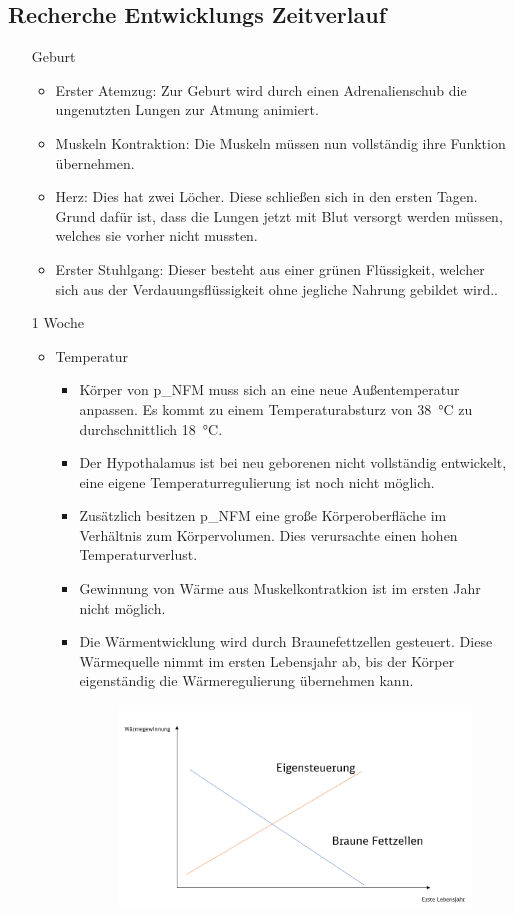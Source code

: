 \subsection{Recherche Entwicklungs Zeitverlauf}
\begin{enumerate}%
	\item[Geburt]
	\begin{itemize}
		\item Erster Atemzug: Zur Geburt wird durch einen Adrenalienschub die ungenutzten Lungen zur Atmung animiert.
		\item Muskeln Kontraktion: Die Muskeln müssen nun vollständig ihre Funktion übernehmen.
		\item Herz: Dies hat zwei Löcher. Diese schließen sich in den ersten Tagen. Grund dafür ist, dass die Lungen jetzt mit Blut versorgt werden müssen, welches sie vorher nicht mussten.
		\item Erster Stuhlgang: Dieser besteht aus einer grünen Flüssigkeit, welcher sich aus der Verdauungsflüssigkeit ohne jegliche Nahrung gebildet wird..
	\end{itemize}
	\item[1 Woche]
	\begin{itemize}
		\item Temperatur
		\begin{itemize}
			\item Körper von \gls{p_NFM} muss sich an eine neue Außentemperatur anpassen. Es kommt zu einem Temperaturabsturz von \SI{38}{\celsius} zu durchschnittlich \SI{18}{\celsius}.
			\item Der Hypothalamus ist bei neu geborenen nicht vollständig entwickelt, eine eigene Temperaturregulierung ist noch nicht möglich.
			\item Zusätzlich besitzen \gls{p_NFM} eine große Körperoberfläche im Verhältnis zum Körpervolumen. Dies verursachte einen hohen Temperaturverlust. 
			\item Gewinnung von Wärme aus Muskelkontratkion ist im ersten Jahr nicht möglich.
			\item Die Wärmentwicklung wird durch Braunefettzellen gesteuert. Diese Wärmequelle nimmt im ersten Lebensjahr ab, bis der Körper eigenständig die Wärmeregulierung übernehmen kann.
			\begin{figure}[H]
				\centering
				\includegraphics[scale = 0.3]{attachment/chapter_9/Scc001}

\end{figure}
\end{itemize}
\end{itemize}
\end{enumerate}
